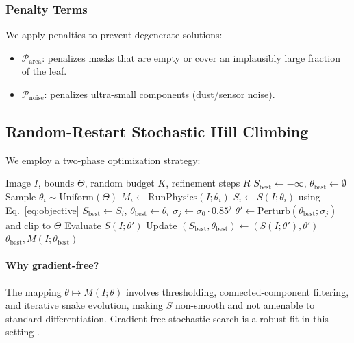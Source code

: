 \documentclass[journal]{IEEEtran}
\begin{document}
\subsubsection{Penalty Terms}
We apply penalties to prevent degenerate solutions:
\begin{itemize}
    \item $\mathcal{P}_{\mathrm{area}}$: penalizes masks that are empty or cover an implausibly large fraction of the leaf.
    \item $\mathcal{P}_{\mathrm{noise}}$: penalizes ultra-small components (dust/sensor noise).
\end{itemize}

\subsection{Random-Restart Stochastic Hill Climbing}
We employ a two-phase optimization strategy:
\begin{algorithm}
\caption{Stochastic Parameter Optimization (per image)}
\begin{algorithmic}[1]
\REQUIRE Image $I$, bounds $\Theta$, random budget $K$, refinement steps $R$
\STATE $S_{\mathrm{best}} \leftarrow -\infty$, $\theta_{\mathrm{best}}\leftarrow \emptyset$
    \STATE Sample $\theta_i \sim \mathrm{Uniform}(\Theta)$
    \STATE $M_i \leftarrow \mathrm{RunPhysics}(I;\theta_i)$
    \STATE $S_i \leftarrow S(I;\theta_i)$ using Eq.~\eqref{eq:objective}
        \STATE $S_{\mathrm{best}}\leftarrow S_i$, $\theta_{\mathrm{best}}\leftarrow \theta_i$
    \ENDIF
\ENDFOR
{}
    \STATE $\sigma_j \leftarrow \sigma_0 \cdot 0.85^j$ 
    \STATE $\theta' \leftarrow \mathrm{Perturb}(\theta_{\mathrm{best}};\sigma_j)$ and clip to $\Theta$
    \STATE Evaluate $S(I;\theta')$
        \STATE Update $(S_{\mathrm{best}},\theta_{\mathrm{best}})\leftarrow (S(I;\theta'),\theta')$
    \ENDIF
\ENDFOR
\RETURN $\theta_{\mathrm{best}}, M(I;\theta_{\mathrm{best}})$
\end{algorithmic}
\end{algorithm}

\paragraph{Why gradient-free?}
The mapping $\theta \mapsto M(I;\theta)$ involves thresholding, connected-component filtering, and iterative snake evolution, making $S$ non-smooth and not amenable to standard differentiation. Gradient-free stochastic search is a robust fit in this setting \cite{yu2020hyperparam}.
\end{document}
